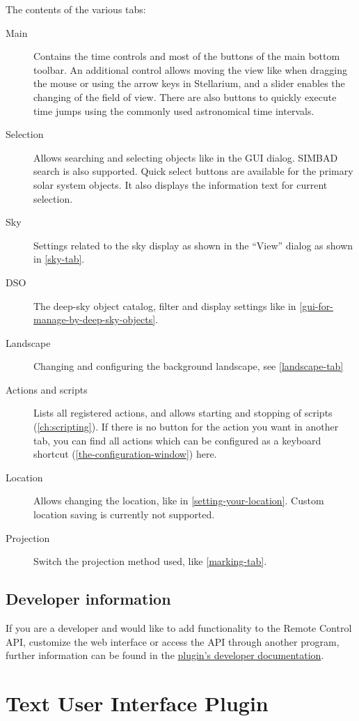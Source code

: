The contents of the various tabs:
\begin{description}
\item[Main] Contains the time controls and most of the buttons of the 
main bottom toolbar. An additional control allows moving the view like when 
dragging the mouse or using the arrow keys in Stellarium, and a slider enables 
the changing of the field of view. There are also buttons to quickly execute 
time jumps using the commonly used astronomical time intervals.
\item[Selection] Allows searching and selecting objects like in the GUI dialog. 
SIMBAD search is also supported. Quick select buttons are available for the 
primary solar system objects. It also displays the information text for current 
selection.
\item[Sky] Settings related to the sky display as shown in the ``View'' dialog 
as shown in \autoref{sky-tab}.
\item[DSO] The deep-sky object catalog, filter and display settings like in 
\autoref{gui-for-manage-by-deep-sky-objects}.
\item[Landscape] Changing and configuring the background landscape, see 
\autoref{landscape-tab}
\item[Actions and scripts] Lists all registered actions, and allows starting 
and stopping of scripts (\autoref{ch:scripting}). If there is no button for the 
action you want in another tab, you can find all actions which can be 
configured as a keyboard shortcut (\autoref{the-configuration-window}) here.
\item[Location] Allows changing the location, like in 
\autoref{setting-your-location}. Custom location saving is currently not 
supported.
\item[Projection] Switch the projection method used, like \autoref{marking-tab}.
\end{description}

\subsection{Developer information}
\label{sec:plugins:RemoteControl:developer}

If you are a developer and would like to add functionality to the Remote 
Control API, customize the web interface or access the API through another 
program, further information can be found in the 
\href{http://stellarium.org/doc-plugins/head/}{plugin's developer 
documentation}.

\section{Text User Interface Plugin}
\label{sec:plugins:TUI}

